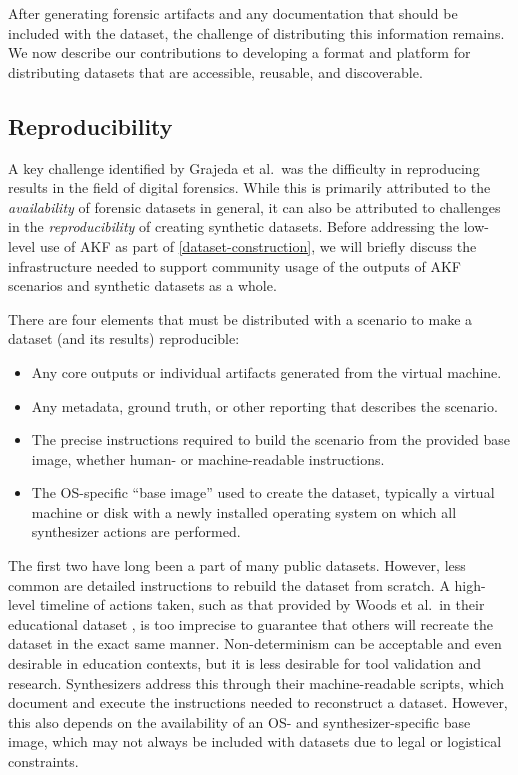 \documentclass[final,5p,times,twocolumn]{elsarticle}
\begin{document}
After generating forensic artifacts and any documentation that should be
included with the dataset, the challenge of distributing this
information remains. We now describe our contributions to developing a
format and platform for distributing datasets that are accessible,
reusable, and discoverable.

\subsection{Reproducibility}\label{reproducibility}

A key challenge identified by Grajeda et al.~was the difficulty in
reproducing results in the field of digital forensics. While this is
primarily attributed to the \emph{availability} of forensic datasets in
general, it can also be attributed to challenges in the
\emph{reproducibility} of creating synthetic datasets. Before addressing
the low-level use of AKF as part of \autoref{dataset-construction}, we
will briefly discuss the infrastructure needed to support community
usage of the outputs of AKF scenarios and synthetic datasets as a whole.

There are four elements that must be distributed with a scenario to make
a dataset (and its results) reproducible:

\begin{itemize}
\item
  Any core outputs or individual artifacts generated from the virtual
  machine.
\item
  Any metadata, ground truth, or other reporting that describes the
  scenario.
\item
  The precise instructions required to build the scenario from the
  provided base image, whether human- or machine-readable instructions.
\item
  The OS-specific ``base image'' used to create the dataset, typically a
  virtual machine or disk with a newly installed operating system on
  which all synthesizer actions are performed.
\end{itemize}

The first two have long been a part of many public datasets. However,
less common are detailed instructions to rebuild the dataset from
scratch. A high-level timeline of actions taken, such as that provided
by Woods et al.~in their educational dataset
\citep{woodsCreatingRealisticCorpora2011}, is too imprecise to
guarantee that others will recreate the dataset in the exact same
manner. Non-determinism can be acceptable and even desirable in
education contexts, but it is less desirable for tool validation and
research. Synthesizers address this through their machine-readable
scripts, which document and execute the instructions needed to
reconstruct a dataset. However, this also depends on the availability of
an OS- and synthesizer-specific base image, which may not always be
included with datasets due to legal or logistical constraints.
\end{document}
